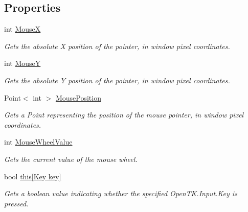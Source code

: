 \subsection*{Properties}
\begin{DoxyCompactItemize}
\item 
int \hyperlink{interface_tri_devs_1_1_tri_engine_1_1_input_1_1_i_input_manager_a83c16b8ea4d95464abaafb187ce6dd48}{Mouse\-X}
\begin{DoxyCompactList}\small\item\em Gets the absolute X position of the pointer, in window pixel coordinates. \end{DoxyCompactList}\item 
int \hyperlink{interface_tri_devs_1_1_tri_engine_1_1_input_1_1_i_input_manager_abf34e14e3a3e440cbed57d231646113a}{Mouse\-Y}
\begin{DoxyCompactList}\small\item\em Gets the absolute Y position of the pointer, in window pixel coordinates. \end{DoxyCompactList}\item 
Point$<$ int $>$ \hyperlink{interface_tri_devs_1_1_tri_engine_1_1_input_1_1_i_input_manager_a1a8c2795e5b11f9dd7103cbf0a876a95}{Mouse\-Position}
\begin{DoxyCompactList}\small\item\em Gets a Point representing the position of the mouse pointer, in window pixel coordinates. \end{DoxyCompactList}\item 
int \hyperlink{interface_tri_devs_1_1_tri_engine_1_1_input_1_1_i_input_manager_a43026ac0472d9e93ed7a9af4678c7ef0}{Mouse\-Wheel\-Value}
\begin{DoxyCompactList}\small\item\em Gets the current value of the mouse wheel. \end{DoxyCompactList}\item 
bool \hyperlink{interface_tri_devs_1_1_tri_engine_1_1_input_1_1_i_input_manager_a254f095d63315114c7a8f41c4aac695e}{this\mbox{[}\-Key key\mbox{]}}
\begin{DoxyCompactList}\small\item\em Gets a boolean value indicating whether the specified Open\-T\-K.\-Input.\-Key is pressed. \end{DoxyCompactList}\item 

\end{DoxyCompactItemize}
